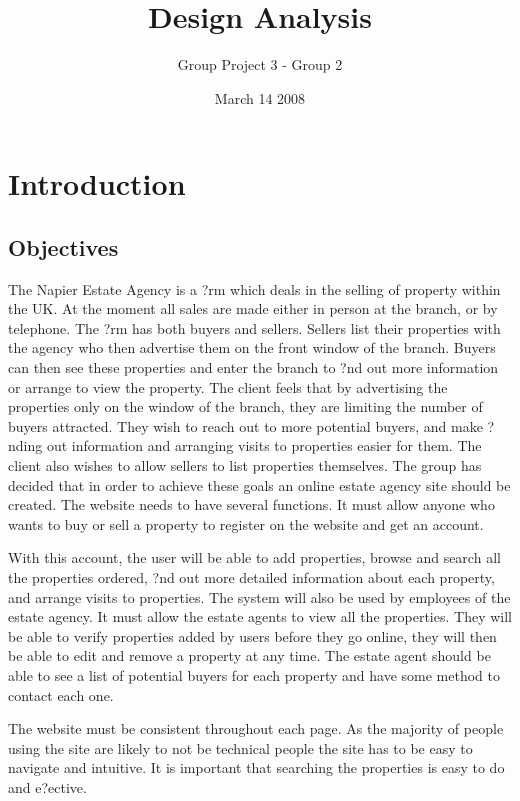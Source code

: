 \documentclass[a4paper,12pt]{article}
\title{Design Analysis}
\author{Group Project 3 - Group 2}
\date{March 14 2008}
\begin{document}
\maketitle
\newpage
\tableofcontents
\newpage




 
\section{Introduction}
\subsection{Objectives}
The Napier Estate Agency is a ?rm which deals in the selling of property within the UK. At the moment all sales are made either in person at the branch, or by telephone. The ?rm has both buyers and sellers. Sellers list their properties with the agency who then advertise them on the front window of the branch. Buyers can then see these properties and enter the branch to ?nd out more information or arrange to view the property.
The client feels that by advertising the properties only on the window of the branch, they are limiting the number of buyers attracted. They wish to reach out to more potential buyers, and make ?nding out information and arranging visits to properties easier for them. The client also wishes to allow sellers to list properties themselves. The group has decided that in order to achieve these goals an online estate agency site should be created.
The website needs to have several functions. It must allow anyone who wants to buy or sell a property to register on the website and get an account.


With this account, the user will be able to add properties, browse and search all the properties ordered, ?nd out more detailed information about each property, and arrange visits to properties.
The system will also be used by employees of the estate agency. It must allow the estate agents to view all the properties. They will be able to verify properties added by users before they go online, they will then be able to edit and remove a property at any time. The estate agent should be able to see a list of potential buyers for each property and have some method to contact each one.

The website must be consistent throughout each page. As the majority of people using the site are likely to not be technical people the site has to be easy to navigate and intuitive. It is important that searching the properties is easy to do and e?ective.
\end{document}
